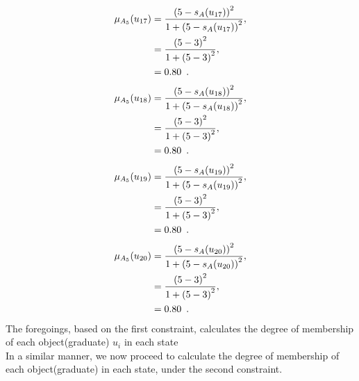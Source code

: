 \documentclass[a4paper,openany]{book}
\begin{document}
				\begin{align}
					\mu_{A_5}(u_{17}) &= \frac{\left(5-s_A(u_{17})\right)^2}{1 + \left(5-s_A(u_{17})\right)^2} ,\\
					&= \frac{\left(5-3\right)^2}{1 + \left(5-3\right)^2} \notag ,\\
					&= 0.80 \enspace. \notag
				\end{align}
				\begin{align}
					\mu_{A_5}(u_{18}) &= \frac{\left(5-s_A(u_{18})\right)^2}{1 + \left(5-s_A(u_{18})\right)^2} ,\\
					&= \frac{\left(5-3\right)^2}{1 + \left(5-3\right)^2} \notag ,\\
					&= 0.80 \enspace. \notag
				\end{align}
				\begin{align}
					\mu_{A_5}(u_{19}) &= \frac{\left(5-s_A(u_{19})\right)^2}{1 + \left(5-s_A(u_{19})\right)^2} ,\\
					&= \frac{\left(5-3\right)^2}{1 + \left(5-3\right)^2} \notag ,\\
					&= 0.80 \enspace. \notag
				\end{align}
				\begin{align}
					\mu_{A_5}(u_{20}) &= \frac{\left(5-s_A(u_{20})\right)^2}{1 + \left(5-s_A(u_{20})\right)^2} ,\\
					&= \frac{\left(5-3\right)^2}{1 + \left(5-3\right)^2} \notag ,\\
					&= 0.80 \enspace. \notag
				\end{align}
			The foregoings, based on the first constraint, calculates the degree of membership of each object(graduate) $u_i$ in each state
			\\
			In a similar manner, we now proceed to calculate the degree of membership of each object(graduate) in each state, under the second constraint.
\end{document}
